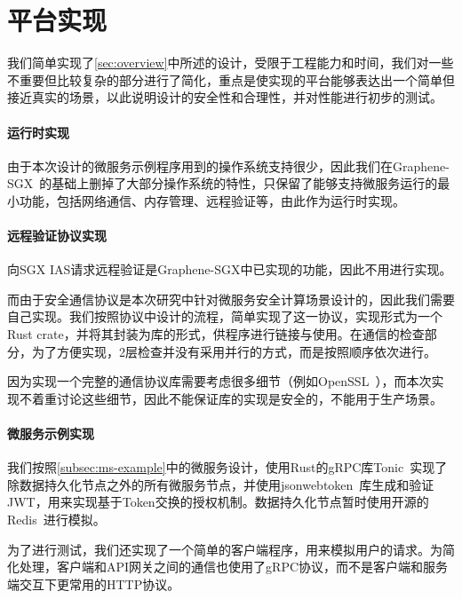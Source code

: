 \section{平台实现}\label{sec:implimentation}

我们简单实现了\cref{sec:overview}中所述的设计，受限于工程能力和时间，我们对一些不重要但比较复杂的部分进行了简化，重点是使实现的平台能够表达出一个简单但接近真实的场景，以此说明设计的安全性和合理性，并对性能进行初步的测试。

\paragraph{运行时实现}

由于本次设计的微服务示例程序用到的操作系统支持很少，因此我们在Graphene-SGX~\cite{}的基础上删掉了大部分操作系统的特性，只保留了能够支持微服务运行的最小功能，包括网络通信、内存管理、远程验证等，由此作为运行时实现。

\paragraph{远程验证协议实现}

向SGX IAS请求远程验证是Graphene-SGX中已实现的功能，因此不用进行实现。

而由于安全通信协议是本次研究中针对微服务安全计算场景设计的，因此我们需要自己实现。我们按照协议中设计的流程，简单实现了这一协议，实现形式为一个Rust crate，并将其封装为库的形式，供程序进行链接与使用。在通信的检查部分，为了方便实现，2层检查并没有采用并行的方式，而是按照顺序依次进行。

因为实现一个完整的通信协议库需要考虑很多细节（例如OpenSSL~\cite{}），而本次实现不着重讨论这些细节，因此不能保证库的实现是安全的，不能用于生产场景。

\paragraph{微服务示例实现}

我们按照\cref{subsec:ms-example}中的微服务设计，使用Rust的gRPC库Tonic~\cite{}实现了除数据持久化节点之外的所有微服务节点，并使用jsonwebtoken~\cite{}库生成和验证JWT，用来实现基于Token交换的授权机制。数据持久化节点暂时使用开源的Redis~\cite{}进行模拟。

为了进行测试，我们还实现了一个简单的客户端程序，用来模拟用户的请求。为简化处理，客户端和API网关之间的通信也使用了gRPC协议，而不是客户端和服务端交互下更常用的HTTP协议。
